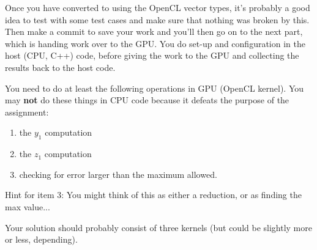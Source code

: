 \documentclass[letterpaper,10pt]{article}
\begin{document}
Once you have converted to using the OpenCL vector types, it's probably a good idea 
to test with some test cases and make sure that nothing was broken by this. Then make 
a commit to save your work and you'll then go on to the next part, which is handing 
work over to the GPU. You do set-up and configuration in the host (CPU, C++) code, before giving the work to the GPU and collecting the results back to the host code.

You need to do at least the following operations in GPU (OpenCL kernel). You may \textbf{ not } do these things in CPU code because it defeats the purpose of the assignment: 

\begin{enumerate}
\item the $y_{1}$ computation
\item the $z_{1}$ computation
\item checking for error larger than the maximum allowed.
\end{enumerate} 

Hint for item 3:  You might think of this as either a reduction, or as finding the max value...

Your solution should probably consist of three kernels (but could be slightly more or less, depending).
\end{document}
